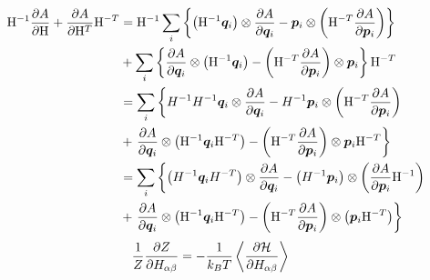 \documentclass[11pt,a4paper,uplatex]{jsarticle}
\begin{document}
\begin{align}
    {\rm H}^{-1} \frac{\partial A}{\partial {\rm H}} + \frac{\partial A}{\partial {\rm H}^{T}}{\rm H}^{-T} &= {\rm H}^{-1} \sum_{i}\left\{ 
        \left({\rm H}^{-1} \bm{q}_{i} \right) \otimes \frac{\partial A }{\partial \bm{q}_{i}} 
        - \bm{p}_{i} \otimes \left( {\rm H}^{-T} \frac{\partial A }{\partial \bm{p}_{i}} \right)
        \right\}\\
         &+ \sum_{i}  \left\{ \frac{\partial A }{\partial \bm{q}_{i}} \otimes 
        \left({\rm H}^{-1} \bm{q}_{i} \right) 
        - \left( {\rm H}^{-T} \frac{\partial A }{\partial \bm{p}_{i}} \right) \otimes \bm{p}_{i} \right\}{\rm H}^{-T}  \\
    &= \sum_{i} \left\{ H^{-1} H^{-1} \bm{q}_{i} \otimes \frac{\partial A }{\partial \bm{q}_{i}} - H^{-1} \bm{p}_{i} \otimes \left( {\rm H}^{-T} \frac{\partial A }{\partial \bm{p}_{i}} \right) \right. \\
    &+ \left. \frac{\partial A }{\partial \bm{q}_{i}} \otimes 
    \left({\rm H}^{-1} \bm{q}_{i} {\rm H}^{-T}  \right)  
    - \left( {\rm H}^{-T} \frac{\partial A }{\partial \bm{p}_{i}} \right) \otimes \bm{p}_{i} {\rm H}^{-T} \right\} \\
    &= \sum_{i}  \left\{ \left( H^{-1} \bm{q}_{i} H^{-T}\right) \otimes \frac{\partial A }{\partial \bm{q}_{i}} 
    - \left( H^{-1} \bm{p}_{i} \right) \otimes \left( \frac{\partial A }{\partial \bm{p}_{i}} {\rm H}^{-1} \right)  \right. \\
    &+ \left. \frac{\partial A }{\partial \bm{q}_{i}} \otimes 
    \left({\rm H}^{-1}  \bm{q}_{i} {\rm H}^{-T} \right)  
    - \left( {\rm H}^{-T} \frac{\partial A }{\partial \bm{p}_{i}} \right) \otimes\left( \bm{p}_{i} {\rm H}^{-T} \right) \right\}
\end{align}
\begin{align}
\frac{1}{Z}\frac{\partial Z}{\partial H_{\alpha \beta}} &= -\frac{1}{k_{B}T} \left< \frac{\partial {\cal H}}{\partial H_{\alpha \beta}}\right>
\end{align}
\end{document}
